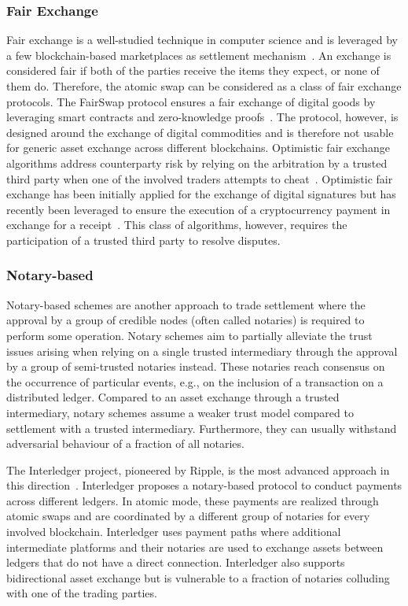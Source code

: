 \subsubsection{Fair Exchange}
Fair exchange is a well-studied technique in computer science and is leveraged by a few blockchain-based marketplaces as settlement mechanism~\cite{pagnia2003fair}.
An exchange is considered fair if both of the parties receive the items they expect, or none of them do.
Therefore, the atomic swap can be considered as a class of fair exchange protocols.
The FairSwap protocol ensures a fair exchange of digital goods by leveraging smart contracts and zero-knowledge proofs~\cite{dziembowski2018fairswap}.
The protocol, however, is designed around the exchange of digital commodities and is therefore not usable for generic asset exchange across different blockchains.
Optimistic fair exchange algorithms address counterparty risk by relying on the arbitration by a trusted third party when one of the involved traders attempts to cheat~\cite{asokan1997optimistic}.
Optimistic fair exchange has been initially applied for the exchange of digital signatures but has recently been leveraged to ensure the execution of a cryptocurrency payment in exchange for a receipt~\cite{liu2018toward}.
This class of algorithms, however, requires the participation of a trusted third party to resolve disputes.

\subsubsection{Notary-based}
Notary-based schemes are another approach to trade settlement where the approval by a group of credible nodes (often called notaries) is required to perform some operation.
Notary schemes aim to partially alleviate the trust issues arising when relying on a single trusted intermediary through the approval by a group of semi-trusted notaries instead.
These notaries reach consensus on the occurrence of particular events, e.g., on the inclusion of a transaction on a distributed ledger.
Compared to an asset exchange through a trusted intermediary, notary schemes assume a weaker trust model compared to settlement with a trusted intermediary. Furthermore, they can usually withstand adversarial behaviour of a fraction of all notaries.

The Interledger project, pioneered by Ripple, is the most advanced approach in this direction~\cite{thomas2015protocol}.
Interledger proposes a notary-based protocol to conduct payments across different ledgers.
In atomic mode, these payments are realized through atomic swaps and are coordinated by a different group of notaries for every involved blockchain.
Interledger uses payment paths where additional intermediate platforms and their notaries are used to exchange assets between ledgers that do not have a direct connection.
Interledger also supports bidirectional asset exchange but is vulnerable to a fraction of notaries colluding with one of the trading parties.

